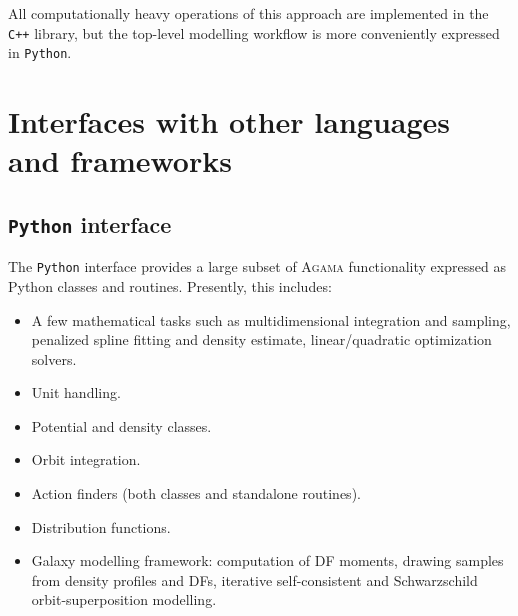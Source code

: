\documentclass[12pt]{article}
\newcommand{\Agama}{\textsc{Agama}\xspace}
\newcommand{\Cpp}  {\texttt{C++}\xspace}
\newcommand{\Python}{\texttt{Python}\xspace}
\begin{document}
All computationally heavy operations of this approach are implemented in the \Cpp library, but the top-level modelling workflow is more conveniently expressed in \Python. 


\section{Interfaces with other languages and frameworks}  \label{sec:Interfaces}

\subsection{\Python interface}  \label{sec:Python}

The \Python interface provides a large subset of \Agama functionality expressed as Python classes and routines. Presently, this includes:
\begin{itemize}  \setlength{\parskip}{2pt} \setlength{\itemsep}{2pt}
\item A few mathematical tasks such as multidimensional integration and sampling, penalized spline fitting and density estimate, linear/quadratic optimization solvers.
\item Unit handling.
\item Potential and density classes.
\item Orbit integration.
\item Action finders (both classes and standalone routines).
\item Distribution functions.
\item Galaxy modelling framework: computation of DF moments, drawing samples from density profiles and DFs, iterative self-consistent and Schwarzschild orbit-superposition modelling.
\end{itemize}
\end{document}
